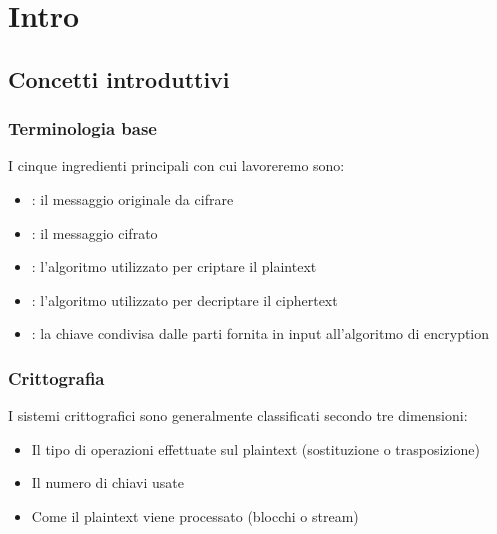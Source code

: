 \section{Intro}

	\begin{frame}
		\begin{center}
			\LARGE{}
		\end{center}
	\end{frame}

	\subsection{Concetti introduttivi}
	
		\begin{frame}
			\frametitle{Terminologia base}		
			I cinque ingredienti principali con cui lavoreremo sono:
			\begin{itemize}
				\item {}: il messaggio originale da cifrare
				\item {}: il messaggio cifrato
				\item {}: l'algoritmo utilizzato per criptare il plaintext
				\item {}: l'algoritmo utilizzato per decriptare il ciphertext
				\item {}: la chiave condivisa dalle parti fornita in input all'algoritmo di encryption
			\end{itemize}
		\end{frame}
		
		\begin{frame}
			\frametitle{Crittografia}		
			I sistemi crittografici sono generalmente classificati secondo tre dimensioni:
			\begin{itemize}
				\item Il tipo di operazioni effettuate sul plaintext (sostituzione o trasposizione)
				\item Il numero di chiavi usate
				\item Come il plaintext viene processato (blocchi o stream)
			\end{itemize}
		\end{frame}
	
